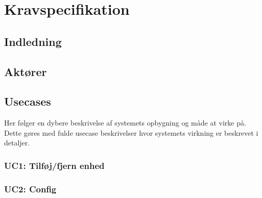 \chapter{Kravspecifikation}

\clearpage


\section{Indledning}



\section{Aktører}



\section{Usecases}

Her følger en dybere beskrivelse af systemets opbygning og måde at virke på. Dette gøres med fulde usecase beskrivelser hvor systemets virkning er beskrevet i detaljer.

%


\subsection{UC1: Tilføj/fjern enhed}



\subsection{UC2: Config}


